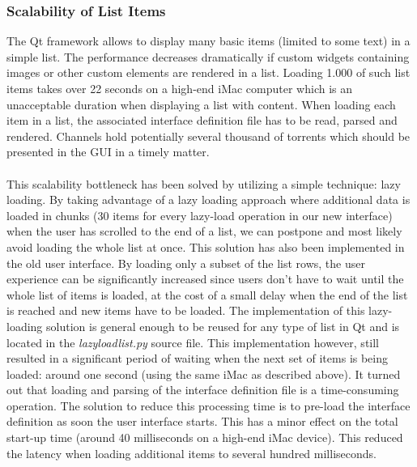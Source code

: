 \subsubsection{\textbf{Scalability of List Items}}
The Qt framework allows to display many basic items (limited to some text) in a simple list. The performance decreases dramatically if custom widgets containing images or other custom elements are rendered in a list. Loading 1.000 of such list items takes over 22 seconds on a high-end iMac computer which is an unacceptable duration when displaying a list with content. When loading each item in a list, the associated interface definition file has to be read, parsed and rendered. Channels hold potentially several thousand of torrents which should be presented in the GUI in a timely matter.\\\\
This scalability bottleneck has been solved by utilizing a simple technique: lazy loading. By taking advantage of a lazy loading approach where additional data is loaded in chunks (30 items for every lazy-load operation in our new interface) when the user has scrolled to the end of a list, we can postpone and most likely avoid loading the whole list at once. This solution has also been implemented in the old user interface. By loading only a subset of the list rows, the user experience can be significantly increased since users don't have to wait until the whole list of items is loaded, at the cost of a small delay when the end of the list is reached and new items have to be loaded. The implementation of this lazy-loading solution is general enough to be reused for any type of list in Qt and is located in the \emph{lazyloadlist.py} source file. This implementation however, still resulted in a significant period of waiting when the next set of items is being loaded: around one second (using the same iMac as described above). It turned out that loading and parsing of the interface definition file is a time-consuming operation. The solution to reduce this processing time is to pre-load the interface definition as soon the user interface starts. This has a minor effect on the total start-up time (around 40 milliseconds on a high-end iMac device). This reduced the latency when loading additional items to several hundred milliseconds.

